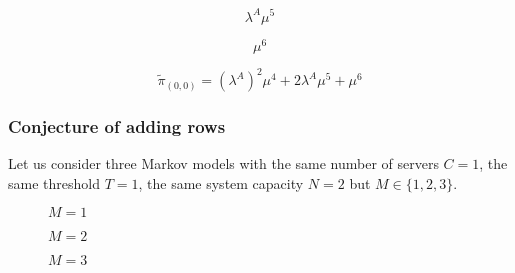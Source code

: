 \begin{multicols}{4}
    \begin{figure}[H]
        \centering
        \scalebox{0.6}{
            }
    \end{figure}
    \vspace*{\fill}
    \columnbreak
    \vspace*{0.3cm}
    \begin{equation*}
        \lambda^A \mu^5
    \end{equation*}
    \vspace*{\fill}
    \columnbreak
    \begin{figure}[H]
        \centering
        \scalebox{0.6}{
            }
    \end{figure}
    \vspace*{\fill}
    \columnbreak
    \vspace*{0.3cm}
    \begin{equation*}
        \mu^6
    \end{equation*}
\end{multicols}


\begin{equation*}
    \tilde{\pi}_{(0,0)} = (\lambda^A)^2 \mu^4 + 2 \lambda^A \mu^5 + \mu^6
\end{equation*}

\newpage
\subsubsection{Conjecture of adding rows}

Let us consider three Markov models with the same number of servers \(C=1\), 
the same threshold \(T=1\), the same system capacity \(N=2\) but 
\(M\in\{1, 2, 3\}\).


\begin{multicols}{3}
    \begin{figure}[H]
        \centering
        \scalebox{0.8}{
            }
        \caption{\(M=1\)}
    \end{figure}
    \columnbreak
    \begin{figure}[H]
        \centering
        \scalebox{0.8}{
            }
        \caption{\(M=2\)}
    \end{figure}
    \begin{figure}[H]
        \centering
        \scalebox{0.8}{
            }
        \caption{\(M=3\)}
    \end{figure}
\end{multicols}

